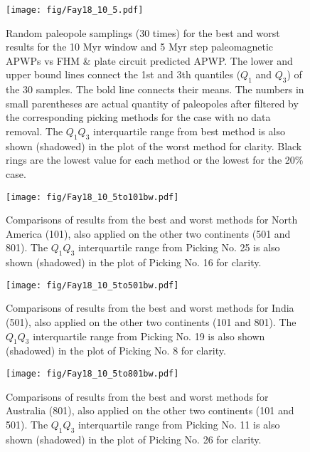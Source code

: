 \begin{figure}
    \centering
        \texttt{[image: fig/Fay18\_10\_5.pdf]}
    \captionsetup{width=.95\textwidth}
    \caption{Random paleopole samplings (30 times) for the best and worst
	results for the 10 Myr window and 5 Myr step paleomagnetic APWPs vs FHM \&
	plate circuit predicted APWP\@. The lower and upper bound lines connect the
	1st and 3th quantiles ($Q_1$ and $Q_3$) of the 30 samples. The bold line
	connects their means. The numbers in small parentheses are actual quantity
	of paleopoles after filtered by the corresponding picking methods for the
	case with no data removal. The $Q_1$\textendash$Q_3$ interquartile range
	from best method is also shown (shadowed) in the plot of the worst method
	for clarity. Black rings are the lowest value for each method or the lowest
	for the 20\% case.}\label{Fig:Fay18_10_5bw}
\end{figure}

\begin{figure}
    \centering
        \texttt{[image: fig/Fay18\_10\_5to101bw.pdf]}
    \captionsetup{width=.95\textwidth}
    \caption{Comparisons of results from the best and worst methods for North
	America (101), also applied on the other two continents (501 and 801). The
	$Q_1$\textendash$Q_3$ interquartile range from Picking No. 25 is also shown
	(shadowed) in the plot of Picking No. 16 for clarity.}\label{Fig:Fay18_10_5to101bw}
\end{figure}

\begin{figure}
    \centering
        \texttt{[image: fig/Fay18\_10\_5to501bw.pdf]}
    \captionsetup{width=.95\textwidth}
	\caption{Comparisons of results from the best and worst methods for India
	(501), also applied on the other two continents (101 and 801). The
	$Q_1$\textendash$Q_3$ interquartile range from Picking No. 19 is also shown
	(shadowed) in the plot of Picking No. 8 for clarity.}\label{Fig:Fay18_10_5to501bw}
\end{figure}

\begin{figure}
    \centering
        \texttt{[image: fig/Fay18\_10\_5to801bw.pdf]}
    \captionsetup{width=.95\textwidth}
    \caption{Comparisons of results from the best and worst methods for
	Australia (801), also applied on the other two continents (101 and 501). The
	$Q_1$\textendash$Q_3$ interquartile range from Picking No. 11 is also shown
	(shadowed) in the plot of Picking No. 26 for clarity.}\label{Fig:Fay18_10_5to801bw}
\end{figure}


